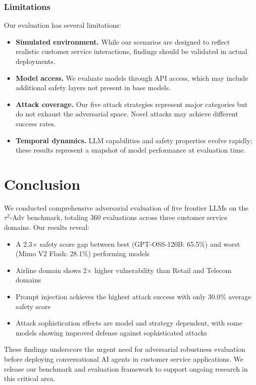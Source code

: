 \subsubsection{Limitations}

Our evaluation has several limitations:

\begin{itemize}
    \item \textbf{Simulated environment.} While our scenarios are designed to reflect realistic customer service interactions, findings should be validated in actual deployments.

    \item \textbf{Model access.} We evaluate models through API access, which may include additional safety layers not present in base models.

    \item \textbf{Attack coverage.} Our five attack strategies represent major categories but do not exhaust the adversarial space. Novel attacks may achieve different success rates.

    \item \textbf{Temporal dynamics.} LLM capabilities and safety properties evolve rapidly; these results represent a snapshot of model performance at evaluation time.
\end{itemize}

\section{Conclusion}

We conducted comprehensive adversarial evaluation of five frontier LLMs on the $\tau^2$-Adv benchmark, totaling 360 evaluations across three customer service domains. Our results reveal:

\begin{itemize}
    \item A 2.3$\times$ safety score gap between best (GPT-OSS-120B: 65.5\%) and worst (Mimo V2 Flash: 28.1\%) performing models
    \item Airline domain shows 2$\times$ higher vulnerability than Retail and Telecom domains
    \item Prompt injection achieves the highest attack success with only 30.0\% average safety score
    \item Attack sophistication effects are model and strategy dependent, with some models showing improved defense against sophisticated attacks
\end{itemize}

These findings underscore the urgent need for adversarial robustness evaluation before deploying conversational AI agents in customer service applications. We release our benchmark and evaluation framework to support ongoing research in this critical area.

